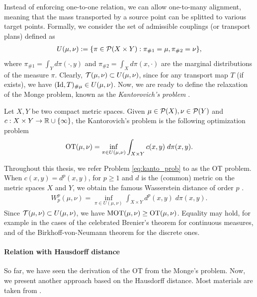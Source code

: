 Instead of enforcing one-to-one relation, we can allow one-to-many alignment,
meaning that the mass transported by a source point can be splitted to various target points.
Formally, we consider the set of admissible couplings (or transport plans) defined as
\begin{align}
  U(\mu, \nu) := \{ \pi \in \mathcal P(X \times Y): \pi_{\# 1} = \mu, \pi_{\# 2} = \nu \},
\end{align}
where $\pi_{\# 1} = \int_Y d \pi(\cdot, y)$ and $\pi_{\# 2} = \int_X d\pi(x, \cdot)$
are the marginal distributions of the measure $\pi$. Clearly, $\mathcal T(\mu, \nu) \subset U(\mu, \nu)$,
since for any transport map $T$ (if exists), we have $(\text{Id}, T)_{\# \mu} \in U(\mu, \nu)$. Now,
we are ready to define the relaxation of the Monge problem,
known as the \textit{Kantorovich's problem} \citep{Kanto42}.
\begin{definition}
  Let $X, Y$ be two compact metric spaces. Given $\mu \in \mathcal P(X), \nu \in \mathcal P(Y)$
  and $c: X \times Y \to \mathbb R \cup \{\infty\}$, the Kantorovich's problem is
  the following optimization problem
  \begin{align}
    \label{eq:kanto_prob}
    \text{OT}(\mu, \nu) = \inf_{\pi \in U(\mu, \nu)} \int_{X \times Y} c(x, y) \; d\pi(x, y).
  \end{align}
\end{definition}
Throughout this thesis, we refer Problem \eqref{eq:kanto_prob} to as the OT problem.
When $c(x, y) = d^p(x, y)$, for $p \geq 1$ and $d$ is the (common) metric on the metric spaces
$X$ and $Y$, we obtain the famous Wasserstein distance of order $p$ \citep{Villani03}.
\begin{align}
  W^p_p(\mu, \nu) = \inf_{\pi \in U(\mu, \nu)} \int_{X \times Y} d^p(x, y) \; d\pi(x, y).
\end{align}
Since $\mathcal T(\mu, \nu) \subset U(\mu, \nu)$, we have $\text{MOT}(\mu, \nu) \geq \text{OT}(\mu, \nu)$.
Equality may hold, for example in the cases of the celebrated Brenier's theorem \citep{Brenier87}
for continuous measures, and of the Birkhoff-von-Neumann theorem \citep{Birkhoff46}
for the discrete ones.

\paragraph{Relation with Hausdorff distance}
So far, we have seen the derivation of the OT from the Monge's problem.
Now, we present another approach based on the Hausdorff distance.
Most materials are taken from \citep{Memoli11}.

